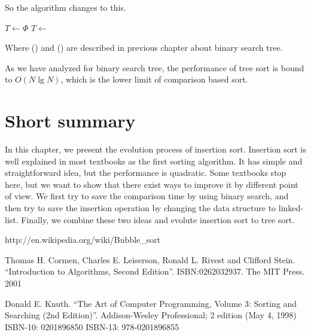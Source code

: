 \documentclass{article}
\begin{document}
So the algorithm changes to this.

\begin{algorithmic}
  \State $T \gets \Phi$
    \State $T \gets $ 
  \EndFor
  \State \Return {}
\EndFunction
\end{algorithmic}

Where () and () are described in 
previous chapter about binary search tree.

As we have analyzed for binary search tree, the performance of tree sort
is bound to $O(N \lg N)$, which is the lower limit of comparison based 
sort\cite{Knuth}.

\section{Short summary} 
In this chapter, we present the evolution process of insertion sort. Insertion
sort is well explained in most textbooks as the first sorting algorithm.
It has simple and straightforward idea, but the performance is quadratic.
Some textbooks stop here, but we want to show that there exist ways to improve
it by different point of view. We first try to save the comparison time
by using binary search, and then try to save the insertion operation by
changing the data structure to linked-list. Finally, we combine these
two ideas and evolute insertion sort to tree sort.

\begin{thebibliography}{99}

http://en.wikipedia.org/wiki/Bubble\_sort

Thomas H. Cormen, Charles E. Leiserson, Ronald L. Rivest and Clifford Stein. 
``Introduction to Algorithms, Second Edition''. ISBN:0262032937. The MIT Press. 2001

Donald E. Knuth. ``The Art of Computer Programming, Volume 3: Sorting and Searching (2nd Edition)''. Addison-Wesley Professional; 2 edition (May 4, 1998) ISBN-10: 0201896850 ISBN-13: 978-0201896855

\end{thebibliography}

\ifx\wholebook\relax\else
\end{document}
